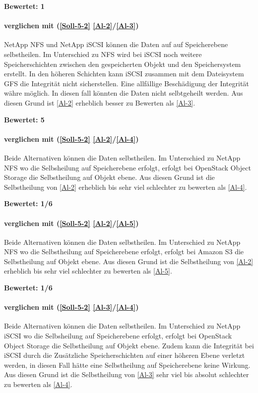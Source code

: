 \textbf{Bewertet: 1}


\paragraph*{  verglichen mit  (\ref{Soll-5-2} \ref{Al-2}/\ref{Al-3})}
NetApp NFS und NetApp iSCSI können die Daten auf auf Speicherebene selbstheilen. Im Unterschied zu NFS wird bei iSCSI noch weitere Speicherschichten zwischen den gespeicherten Objekt und den Speichersystem erstellt. In den höheren Schichten kann iSCSI zusammen mit dem Dateisystem GFS die Integrität nicht sicherstellen. Eine allfällige Beschädigung der Integrität währe möglich. In diesen fall könnten die Daten nicht selbtgeheilt werden. Aus diesen Grund ist  \ref{Al-2} erheblich besser zu Bewerten als  \ref{Al-3}.

\textbf{Bewertet: 5}

\paragraph*{  verglichen mit  (\ref{Soll-5-2} \ref{Al-2}/\ref{Al-4})}
Beide Alternativen können die Daten selbstheilen. Im Unterschied zu NetApp NFS wo die Selbsheilung auf Speicherebene erfolgt, erfolgt bei OpenStack Object Storage die Selbstheilung auf Objekt ebene. Aus diesen Grund ist die Selbstheilung von  \ref{Al-2} erheblich bis sehr viel schlechter zu bewerten als  \ref{Al-4}.

\textbf{Bewertet: 1/6}


\paragraph*{  verglichen mit  (\ref{Soll-5-2} \ref{Al-2}/\ref{Al-5})}
Beide Alternativen können die Daten selbstheilen. Im Unterschied zu NetApp NFS wo die Selbstheilung auf Speicherebene erfolgt, erfolgt bei Amazon S3 die Selbstheilung auf Objekt ebene. Aus diesen Grund ist die Selbstheilung von  \ref{Al-2} erheblich bis sehr viel schlechter zu bewerten als  \ref{Al-5}.

\textbf{Bewertet: 1/6}

\paragraph*{  verglichen mit  (\ref{Soll-5-2} \ref{Al-3}/\ref{Al-4})}
Beide Alternativen können die Daten selbstheilen. Im Unterschied zu NetApp iSCSI wo die Selbsheilung auf Speicherebene erfolgt, erfolgt bei OpenStack Object Storage die Selbstheilung auf Objekt ebene. Zudem kann die Integrität bei iSCSI durch die Zusätzliche Speicherschichten auf einer höheren Ebene verletzt werden, in diesen Fall hätte eine Selbstheilung auf Speicherebene keine Wirkung. Aus diesen Grund ist die Selbstheilung von  \ref{Al-3} sehr viel bis absolut schlechter zu bewerten als  \ref{Al-4}.


